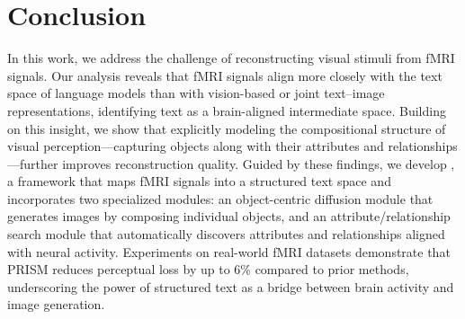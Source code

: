 \section{Conclusion}
In this work, we address the challenge of reconstructing visual stimuli from fMRI signals. Our analysis reveals that fMRI signals align more closely with the text space of language models than with vision-based or joint text–image representations, identifying text as a brain-aligned intermediate space. Building on this insight, we show that explicitly modeling the compositional structure of visual perception—capturing objects along with their attributes and relationships—further improves reconstruction quality. Guided by these findings, we develop \prism, a framework that maps fMRI signals into a structured text space and incorporates two specialized modules: an object-centric diffusion module that generates images by composing individual objects, and an attribute/relationship search module that automatically discovers attributes and relationships aligned with neural activity. Experiments on real-world fMRI datasets demonstrate that PRISM reduces perceptual loss by up to 6\% compared to prior methods, underscoring the power of structured text as a bridge between brain activity and image generation.




